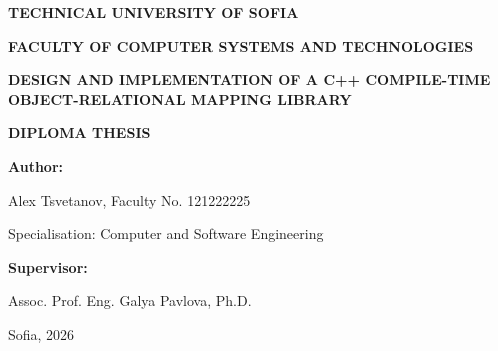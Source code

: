 \documentclass[12pt]{article}
\begin{document}
\begin{titlepage}
\begin{center}
    {\fontsize{18}{21.6}\selectfont\bfseries TECHNICAL UNIVERSITY OF SOFIA\par}
    \vspace{0.5cm}
    {\fontsize{16}{19.2}\selectfont\bfseries FACULTY OF COMPUTER SYSTEMS AND TECHNOLOGIES\par}

    \vspace{1.5cm}

    {\fontsize{20}{24}\selectfont\bfseries DESIGN AND IMPLEMENTATION OF A C++ COMPILE-TIME OBJECT-RELATIONAL MAPPING LIBRARY\par}

    \vspace{1.5cm}

    {\fontsize{14}{16.8}\selectfont\bfseries DIPLOMA THESIS\par}

    \vfill

    \begin{flushleft}
    {\fontsize{14}{16.8}\selectfont\bfseries Author:\par}
    Alex Tsvetanov, Faculty No. 121222225\par
    Specialisation: Computer and Software Engineering\par

    \vspace{1cm}

    {\fontsize{14}{16.8}\selectfont\bfseries Supervisor:\par}
    Assoc. Prof. Eng. Galya Pavlova, Ph.D.\par
    \end{flushleft}

    \vfill

    {\fontsize{12}{14.4}\selectfont Sofia, 2026\par}
\end{center}
\end{titlepage}

\newpage
{}
\tableofcontents
\newpage




\newpage
\end{document}
